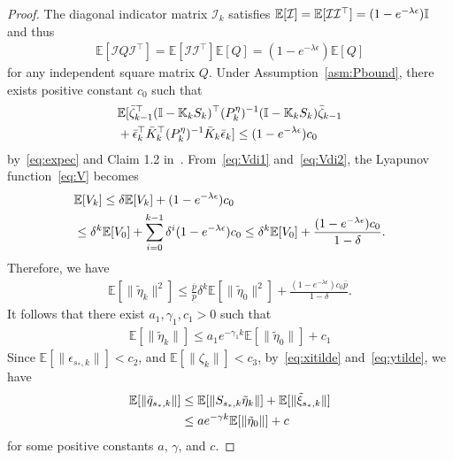 \documentclass[letterpaper, 10 pt, conference]{ieeeconf}
\begin{document}
\begin{proof}
The diagonal indicator matrix $\mathcal{I}_k$ satisfies
$\mathbb{E}[\mathcal{I}]=\mathbb{E}[\mathcal{I}\mathcal{I}^\top]=(1-e^{-\lambda \epsilon}) \mathbb{I}$ and thus
\begin{align}
    \mathbb{E}[\mathcal{I}Q \mathcal{I}^\top]
    =\mathbb{E}[\mathcal{I}\mathcal{I}^\top]\mathbb{E}[Q]
    =(1-e^{-\lambda \epsilon})\mathbb{E}[Q]
    \label{eq:expec}
\end{align}
for any independent square matrix $Q$.
Under Assumption~\ref{asm:Pbound}, there exists positive constant $c_0$ such that
\begin{align}
    &\mathbb{E}[\bar{\zeta}_{k-1}^\top (\mathbb{I}-\mathbb{K}_kS_k)^\top (P_k^{\eta})^{-1} (\mathbb{I}-\mathbb{K}_kS_k) \bar{\zeta}_{k-1}\nonumber\\
    &+\bar{\epsilon}_k^\top \bar{K}_k^\top (P_k^{\eta})^{-1} \bar{K}_k \bar{\epsilon}_k]
    \leq (1-e^{-\lambda \epsilon})c_0
\label{eq:Vdi2}
\end{align}
by~\eqref{eq:expec} and Claim 1.2 in~\cite{wan2019attackArx}.
From~\eqref{eq:Vdi1} and~\eqref{eq:Vdi2}, the Lyapunov function~\eqref{eq:V} becomes
\begin{align*}
    &\mathbb{E}[V_k] \leq \delta \mathbb{E}[V_k]+(1-e^{-\lambda \epsilon})c_0 \nonumber\\
    &\leq \delta^k \mathbb{E}[V_0]+\sum_{i=0}^{k-1}\delta^i (1-e^{-\lambda \epsilon})c_0 \leq \delta^k \mathbb{E}[V_0]+\frac{(1-e^{-\lambda \epsilon})c_0}{1-\delta}.
\end{align*}
Therefore, we have
\begin{align*}
    \mathbb{E}[\|\tilde{\eta}_k\|^2] \leq \frac{\bar{p}}{\underline{p}}\delta^k \mathbb{E}[\|\tilde{\eta}_0\|^2] + \frac{(1-e^{-\lambda \epsilon})c_0 \bar{p}}{1-\delta}.
\end{align*}
It follows that there exist $a_1,\gamma_1,c_1>0$ such that
\begin{align*}
    \mathbb{E}[\|\tilde{\eta}_k\|] \leq a_1 e^{-\gamma_1 k}\mathbb{E}[\|\tilde{\eta}_0\|]+c_1
\end{align*}
Since $\mathbb{E}[\|\epsilon_{s_*,k}\|]<c_2$, and  $\mathbb{E}[\|\zeta_k\|]<c_3$, by~\eqref{eq:xitilde} and~\eqref{eq:ytilde}, we have
\begin{align*}
    \mathbb{E}[\|\tilde{q}_{s_*,k}\|]&\leq
    \mathbb{E}[\|S_{s_*,k}\tilde{\eta}_k\|]+\mathbb{E}[\|\tilde{\xi}_{s_*,k}\|]\nonumber\\
    &\leq
    a e^{-\gamma k}\mathbb{E}[\|\tilde{\eta}_0\|]+c
\end{align*}
for some positive constants $a$, $\gamma$, and $c$.
\end{proof}
\end{document}
